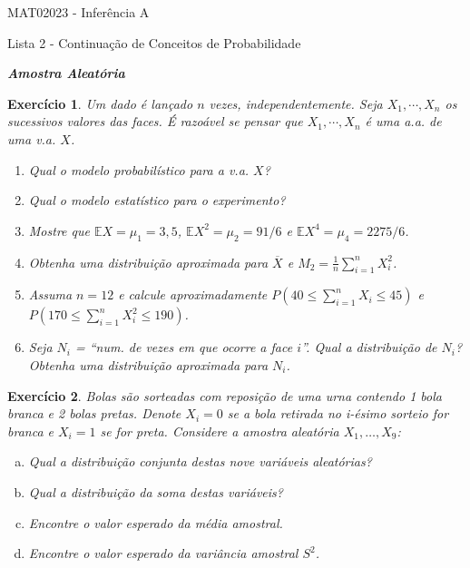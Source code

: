 \documentclass[letter,11pt]{article}
\newtheorem{exer}{Exercício}
\newcommand{\E}{\mathbb{E}}
\begin{document}
\begin{center}{ \Large MAT02023 - Inferência A }\end{center}

\begin{center}
{\large  \sc Lista 2 - Continuação de Conceitos de Probabilidade}
\end{center}
\vspace{15mm}


\noindent \textit{\textbf{Amostra Aleatória}}


\begin{exer} \rm
Um dado é lançado $n$ vezes, independentemente. Seja $X_1,\cdots,X_n$ os 
sucessivos valores das faces. É razoável se pensar que $X_1,\cdots,X_n$ é uma 
a.a. de uma v.a. $X$.
\begin{enumerate}[\bf(a)]
  \item Qual o modelo probabilístico para a v.a. $X$?
  \item Qual o modelo estatístico para o experimento?
  \item Mostre que $\E X = \mu_1 = 3,5$, $\E X^2 = \mu_2 = 91/6$ e $\E X^4 = 
  \mu_4 = 2275/6$.
  \item Obtenha uma distribuição aproximada para $\overline{X}$ e $M_2 = 
  \frac{1}{n}\sum_{i=1}^{n}X_i^2$.
  \item Assuma $n = 12$ e calcule aproximadamente $P(40 \leq \sum_{i=1}^{n}X_i 
  \leq 45)$ e $P(170 \leq \sum_{i=1}^{n}X_i^2\leq 190)$.
  \item Seja $N_i$ = ``num. de vezes em que ocorre a face $i$''. Qual a 
  distribuição de $N_i$? Obtenha uma distribuição aproximada para $N_i$.
\end{enumerate}
\end{exer}

\begin{exer} \rm
Bolas são sorteadas com reposição de uma urna contendo 1 bola branca e 2 bolas 
pretas. Denote $X_i = 0$ se a bola retirada no i-ésimo sorteio for branca e 
$X_i = 1$ se for preta. Considere a amostra aleatória $X_1, \ldots, X_9$:
\begin{enumerate}[a)]
  \item Qual a distribuição conjunta destas nove variáveis aleatórias?
  \item Qual a distribuição da soma destas variáveis?
  \item Encontre o valor esperado da média amostral.
  \item Encontre o valor esperado da variância amostral $S^2$.
\end{enumerate}
\end{exer}
\end{document}
